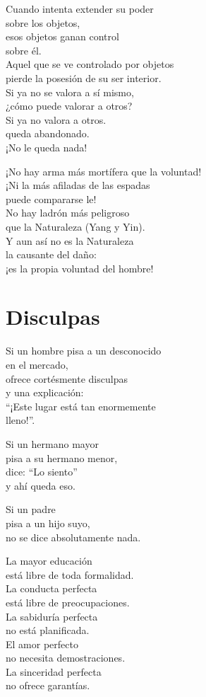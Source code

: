 \documentclass[book,b5paper,hidelinks,final]{memoir}
\begin{document}
	Cuando intenta extender su poder\\
	sobre los objetos,\\
	esos objetos ganan control\\
	sobre él.\\
	Aquel que se ve controlado por objetos\\
	pierde la posesión de su ser interior.\\
	Si ya no se valora a sí mismo,\\
	¿cómo puede valorar a otros?\\
	Si ya no valora a otros.\\
	queda abandonado.\\
	¡No le queda nada!
	
	¡No hay arma más mortífera que la voluntad!\\
	¡Ni la más afiladas de las espadas\\
	puede compararse le!\\
	No hay ladrón más peligroso\\
	que la Naturaleza (Yang y Yin).\\
	Y aun así no es la Naturaleza\\
	la causante del daño:\\
	¡es la propia voluntad del hombre!
	
	\chapter*{Disculpas}
	
	Si un hombre pisa a un desconocido\\
	en el mercado,\\
	ofrece cortésmente disculpas\\
	y una explicación:\\
	``¡Este lugar está tan enormemente\\
	lleno!''.
	
	Si un hermano mayor\\
	pisa a su hermano menor,\\
	dice: ``Lo siento''\\
	y ahí queda eso.
	
	Si un padre\\
	pisa a un hijo suyo,\\
	no se dice absolutamente nada.
	
	La mayor educación\\
	está libre de toda formalidad.\\
	La conducta perfecta\\
	está libre de preocupaciones.\\
	La sabiduría perfecta\\
	no está planificada.\\
	El amor perfecto\\
	no necesita demostraciones.\\
	La sinceridad perfecta\\
	no ofrece garantías.
	
\end{document}
